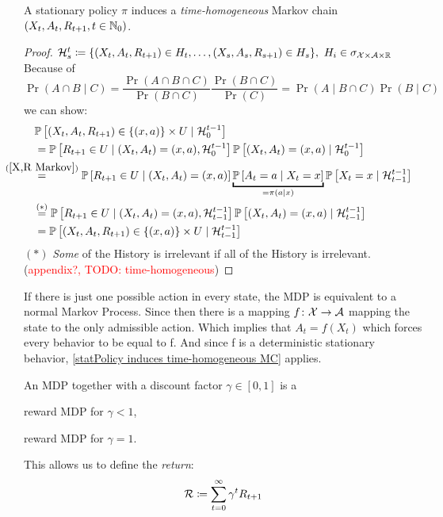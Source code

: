 \begin{remark}\label{statPolicy induces time-homogeneous MC}
	A stationary policy \(\pi\) induces a \emph{time-homogeneous} Markov chain \((X_t,A_t,R_{t+1},t\in\mathbb{N}_0)\).
\end{remark}
\begin{proof} 
	\(\mathcal{H}_s^t\coloneqq \{(X_t,A_t,R_{t+1})\in H_t,\dots,(X_s,A_s,R_{s+1})\in H_s \},\ H_i \in \sigma_{\mathcal{X}\times\mathcal{A}\times\mathbb{R}}\)
	Because of
	\[
		\Pr(A\cap B \mid C)
		=\frac{\Pr(A\cap B\cap C)}{\Pr(B\cap C)}\frac{\Pr(B\cap C)}{\Pr(C)} 
		= \Pr(A\mid B\cap C)\Pr(B\mid C) 
	\]
	we can show:
	\begin{align*}
		&\Pr\left[(X_t,A_t,R_{t+1})\in\{(x,a)\}\times U \mid \cH_0^{t-1} \right] \\
		&=\Pr\left[R_{t+1}\in U \mid (X_t, A_t)=(x,a), \cH_0^{t-1}\right]
		\Pr\left[(X_t, A_t)=(x,a)\mid\cH_0^{t-1}\right]\\
		&\lxeq{(\ref{X,R Markov})}\Pr\left[R_{t+1}\in U \mid (X_t, A_t)=(x,a)\right]
		\underbracket{\Pr\left[A_t=a \mid X_t=x\right]}_{=\pi(a\mid x)}
		\Pr\left[X_t=x\mid \cH_{t-1}^{t-1}\right]\\
		&\lxeq{(*)}\Pr\left[R_{t+1}\in U \mid (X_t, A_t)=(x,a), \cH_{t-1}^{t-1}\right]
		\Pr\left[(X_t, A_t)=(x,a)\mid\cH_{t-1}^{t-1}\right]\\
		&=\Pr\left[(X_t,A_t,R_{t+1})\in\{(x,a)\}\times U \mid \cH_{t-1}^{t-1} \right]
	\end{align*}
	\((*)\) \emph{Some} of the History is irrelevant if all of the History is irrelevant. (\textcolor{red}{appendix?, TODO: time-homogeneous})
\end{proof} 
\begin{remark} 
If there is just one possible action in every state, the MDP is equivalent to a normal Markov Process. 
Since then there is a mapping \(f\colon\mathcal{X}\to\mathcal{A}\) mapping the state to  the only admissible action. Which implies that \(A_t=f(X_t)\) which forces every behavior to be equal to f. And since f is a deterministic stationary behavior, \ref{statPolicy induces time-homogeneous MC} applies.  
\end{remark}

\begin{definition}
An MDP together with a discount factor \(\gamma\in[0,1]\) is a
\begin{description}[font=\normalfont, nosep]
	\item[\emph{discounted}] reward MDP for \(\gamma <1 \),
	\item[\emph{undiscounted}] reward MDP for \(\gamma=1 \).
\end{description}
This allows us to define the \emph{return}:
\[\mathcal{R}\coloneqq\sum_{t=0}^{\infty}\gamma^t R_{t+1}\]
\end{definition}


